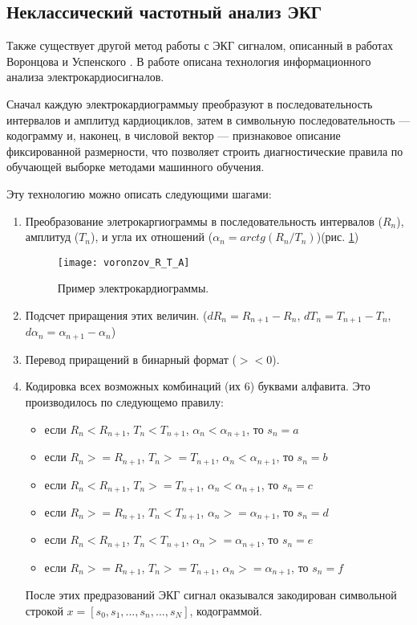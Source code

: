 \subsection{Неклассический частотный анализ ЭКГ}
Также существует другой метод работы с ЭКГ сигналом, описанный в работах Воронцова и Успенского \cite{voronzov}. В работе описана технология информационного анализа электрокардиосигналов. 

Сначал каждую электрокардиограммыу преобразуют в последовательность интервалов и амплитуд кардиоциклов, затем в символьную последовательность — кодограмму и, наконец, в числовой вектор — признаковое описание фиксированной размерности, что позволяет строить диагностические правила по обучающей выборке методами машинного обучения.

Эту технологию можно описать следующими шагами:
\begin{enumerate}
	\item Преобразование элетрокаргиограммы в последовательность интервалов ($R_n$), амплитуд ($T_n$), и угла их отношений ($\alpha_n=arctg(R_n/T_n)$)(рис. \ref{ris:voronzov_R_T_A})
	
	\begin{figure}[h!]
		\begin{center}
			\texttt{[image: voronzov\_R\_T\_A]}
			\caption{Пример электрокардиограммы.}
			\label{ris:voronzov_R_T_A}
		\end{center}
	\end{figure}
	\item Подсчет приращения этих величин. ($dR_n = R_{n+1} - R_{n}$, $dT_n = T_{n+1} - T_{n}$,$d\alpha_n = \alpha_{n+1} - \alpha_{n}$)
	\item Перевод приращений в бинарный формат ($><0$).
	\item Кодировка  всех возможных комбинаций (их 6) буквами алфавита. Это производилось по следующемо правилу:
	\begin{itemize}
		\item если $R_n<R_{n+1}$, $T_n<T_{n+1}$, $\alpha_n<\alpha_{n+1}$, то $s_n=a$
		\item если $R_n>=R_{n+1}$, $T_n>=T_{n+1}$, $\alpha_n<\alpha_{n+1}$, то $s_n=b$		
		\item если $R_n<R_{n+1}$, $T_n>=T_{n+1}$, $\alpha_n<\alpha_{n+1}$, то $s_n=c$		
		\item если $R_n>=R_{n+1}$, $T_n<T_{n+1}$, $\alpha_n>=\alpha_{n+1}$, то $s_n=d$		
		\item если $R_n<R_{n+1}$, $T_n<T_{n+1}$, $\alpha_n>=\alpha_{n+1}$, то $s_n=e$		
		\item если $R_n>=R_{n+1}$, $T_n>=T_{n+1}$, $\alpha_n>=\alpha_{n+1}$, то $s_n=f$		
	\end{itemize}
	После этих предразований ЭКГ сигнал оказывался закодирован символьной строкой $x = [s_0, s_1, ...,s_n, ..., s_N]$, кодограммой.


\end{enumerate}
